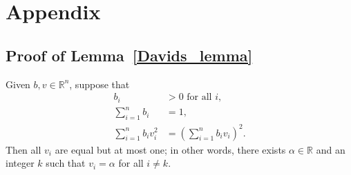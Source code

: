 \section{Appendix}\label{appendixA}

\subsection{Proof of Lemma~\ref{Davids_lemma}}
\begin{lemma}\label{lemA.1}
    Given \( b,v \in \mathbb{R}^{n} \), suppose that
    \begin{subequations}\label{eq4.3}
        \begin{align}
            b_i & > 0 \mbox{ for all } i, \label{eq4.3a} \\
            \sum_{i=1}^n b_i & = 1, \label{eq4.3b} \\
            \sum_{i=1}^n b_i v_i^2 & = \left(\sum_{i=1}^n b_i v_i \right)^2. \label{eq4.3c}
        \end{align}
    \end{subequations}
    Then all \(v_i\) are equal but at most one; in other words, there exists \( \alpha\in\mathbb{R} \) and an integer \(k\) such that \(v_i=\alpha\) for all \(i\ne k\).
\end{lemma}
